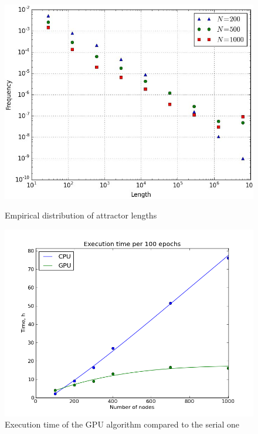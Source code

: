 \documentclass[procedia]{easychair}
\begin{document}
	\begin{figure}[ht!]
		\begin{minipage}[t]{0.45\textwidth}
			\centering
			\includegraphics[width=1.0\textwidth]{plots/attractors}
			\caption{Empirical distribution of attractor lengths}
		\end{minipage}\hfill
		\begin{minipage}[t]{0.45\textwidth}
			\includegraphics[width=1.0\textwidth]{plots/speedup}
			\caption{Execution time of the GPU algorithm compared to the serial one}
		\end{minipage}
	\end{figure}
	
\end{document}
